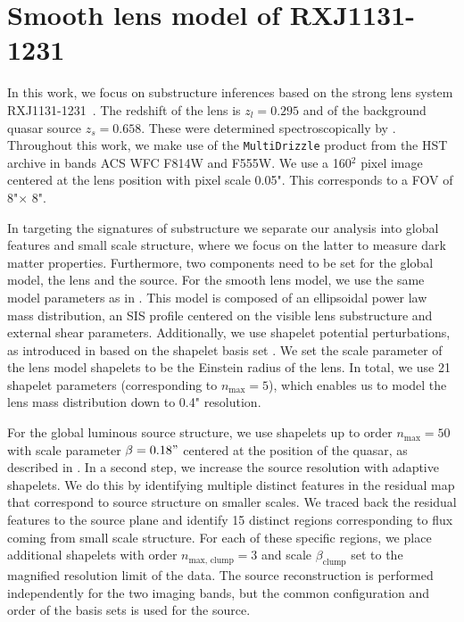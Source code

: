 \documentclass[a4paper,11pt]{article}
\def \RXJ {RXJ1131-1231~}
\begin{document}
\section{Smooth lens model of \RXJ}\label{sec:smooth_lens_model}
In this work, we focus on substructure inferences based on the strong lens system \RXJ. The redshift of the lens is $z_l = 0.295$ and of the background quasar source $z_s = 0.658$. These were determined spectroscopically by \cite{Sluse:2003p8680}. Throughout this work, we make use of the \texttt{MultiDrizzle} product from the HST archive in bands ACS WFC F814W and F555W. We use a 160$^2$ pixel image centered at the lens position with pixel scale 0.05". This corresponds to a FOV of 8"$\times$ 8".

In targeting the signatures of substructure we separate our analysis into global features and small scale structure, where we focus on the latter to measure dark matter properties. Furthermore, two components need to be set for the global model, the lens and the source. 
For the smooth lens model, we use the same model parameters as in \cite{Birrer:2016p13196}. This model is composed of an ellipsoidal power law mass distribution, an SIS profile centered on the visible lens substructure and external shear parameters. Additionally, we use shapelet potential perturbations, as introduced in \cite{Birrer:2015p11550} based on the shapelet basis set \cite{Refregier:2003p8153}. We set the scale parameter of the lens model shapelets to be the Einstein radius of the lens.
In total, we use 21 shapelet parameters (corresponding to $n_{\text{max}}=5$), which enables us to model the lens mass distribution down to 0.4" resolution.

For the global luminous source structure, we use shapelets up to order $n_{\text{max}}=50$ with scale parameter $\beta=0.18"$ centered at the position of the quasar, as described in \cite{Birrer:2015p11550}. In a second step, we increase the source resolution with adaptive shapelets. We do this by identifying multiple distinct features in the residual map that correspond to source structure on smaller scales. We traced back the residual features to the source plane and identify 15 distinct regions corresponding to flux coming from small scale structure. For each of these specific regions, we place additional shapelets with order $n_{\text{max, clump}}=3$ and scale $\beta_{\text{clump}}$ set to the magnified resolution limit of the data. The source reconstruction is performed independently for the two imaging bands, but the common configuration and order of the basis sets is used for the source.
\end{document}
